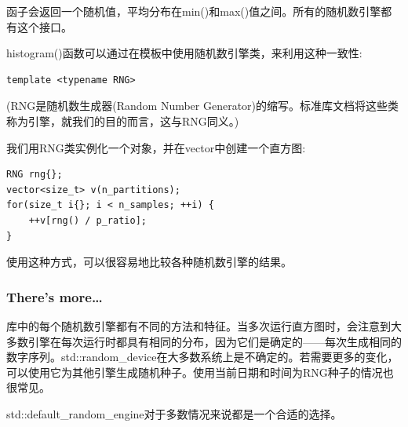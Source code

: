 函子会返回一个随机值，平均分布在min()和max()值之间。所有的随机数引擎都有这个接口。

histogram()函数可以通过在模板中使用随机数引擎类，来利用这种一致性:

\begin{lstlisting}[style=styleCXX]
template <typename RNG>
\end{lstlisting}

(RNG是随机数生成器(Random Number Generator)的缩写。标准库文档将这些类称为引擎，就我们的目的而言，这与RNG同义。)

我们用RNG类实例化一个对象，并在vector中创建一个直方图:

\begin{lstlisting}[style=styleCXX]
RNG rng{};
vector<size_t> v(n_partitions);
for(size_t i{}; i < n_samples; ++i) {
	++v[rng() / p_ratio];
}
\end{lstlisting}

使用这种方式，可以很容易地比较各种随机数引擎的结果。


\subsubsection{There's more…}

库中的每个随机数引擎都有不同的方法和特征。当多次运行直方图时，会注意到大多数引擎在每次运行时都具有相同的分布，因为它们是确定的——每次生成相同的数字序列。std::random\_device在大多数系统上是不确定的。若需要更多的变化，可以使用它为其他引擎生成随机种子。使用当前日期和时间为RNG种子的情况也很常见。

std::default\_random\_engine对于多数情况来说都是一个合适的选择。


















